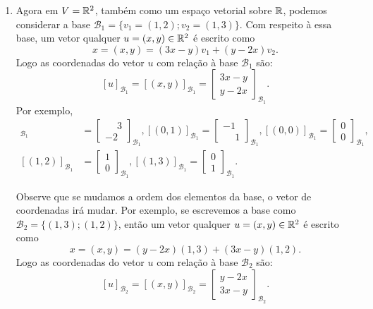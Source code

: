 \begin{exemplos}
\begin{enumerate}
    \item Agora em $V = \mathbb{R}^2$, também como um espaço vetorial sobre $\mathbb{R}$, podemos considerar a base $\mathcal{B}_1 = \{v_1 = (1, 2); v_2 = (1, 3)\}$. Com respeito à essa base, um vetor qualquer $u = (x, y) \in \mathbb{R}^2$ é escrito como
      \[
        x = (x, y) = (3x - y)v_1 + (y - 2x)v_2.
      \]
      Logo as coordenadas do vetor $u$ com relação à base $\mathcal{B}_1$ são:
      \[
        [u]_{\mathcal{B}_1} = [(x, y)]_{\mathcal{B}_1} = \begin{bmatrix}3x - y\\y - 2x\end{bmatrix}_{\mathcal{B}_1}.
      \]
      Por exemplo,
      \begin{align*}
        [(1, 0)]_{\mathcal{B}_1} &= \begin{bmatrix}\phantom{-}3\\-2\end{bmatrix}_{\mathcal{B}_1},
        [(0, 1)]_{\mathcal{B}_1} = \begin{bmatrix}-1\\\phantom{-}1\end{bmatrix}_{\mathcal{B}_1},
        [(0, 0)]_{\mathcal{B}_1} = \begin{bmatrix}0\\0\end{bmatrix}_{\mathcal{B}_1},\\
        [(1, 2)]_{\mathcal{B}_1} &= \begin{bmatrix}1\\0\end{bmatrix}_{\mathcal{B}_1},
        [(1, 3)]_{\mathcal{B}_1} = \begin{bmatrix}0\\1\end{bmatrix}_{\mathcal{B}_1}.
      \end{align*}

      Observe que se mudamos a ordem dos elementos da base, o vetor de coordenadas irá mudar. Por exemplo, se escrevemos a base como $\mathcal{B}_2 = \{(1, 3); (1, 2)\}$, então um vetor qualquer $u = (x, y) \in \mathbb{R}^2$ é escrito como
      \[
        x = (x, y) = (y - 2x)(1, 3) + (3x - y)(1, 2).
      \]
      Logo as coordenadas do vetor $u$ com relação à base $\mathcal{B}_2$ são:
      \[
        [u]_{\mathcal{B}_2} = [(x, y)]_{\mathcal{B}_2} = \begin{bmatrix}y - 2x\\3x - y\end{bmatrix}_{\mathcal{B}_2}.
      \]


\end{enumerate}
\end{exemplos}
